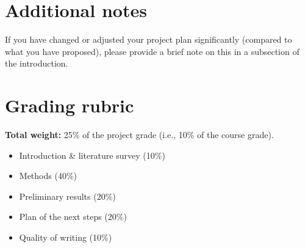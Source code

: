 \documentclass{article}
\begin{document}
\section*{Additional notes}

If you have changed or adjusted your project plan significantly (compared to what you have proposed), please provide a brief note on this in a subsection of the introduction.

\section*{Grading rubric}

\textbf{Total weight:} 25\% of the project grade (i.e., 10\% of the course grade).

\begin{itemize}[leftmargin=2em]
    \item Introduction \& literature survey (10\%)
    \item Methods (40\%)
    \item Preliminary results (20\%)
    \item Plan of the next steps (20\%)
    \item Quality of writing (10\%)
\end{itemize}

\end{document}
